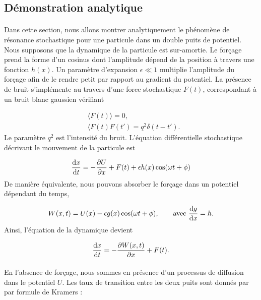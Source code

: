 \subsection{Démonstration analytique}

\paragraph{} Dans cette section, nous allons montrer analytiquement le phénomène de résonance stochastique pour une particule dans un double puits de potentiel. Nous supposons que la dynamique de la particule est sur-amortie. Le forçage prend la forme d'un cosinus %
dont l'amplitude dépend de la position à travers une fonction $h(x)$. Un paramètre d'expansion $\epsilon \ll 1$ multiplie l'amplitude du forçage afin de le rendre petit par rapport au gradient du potentiel. La présence de bruit s'implémente au travers d'une force stochastique $F(t)$, correspondant à un bruit blanc gaussien vérifiant

\begin{equation}\label{force_stochastique}
\begin{split}
	&\langle F(t) \rangle = 0, \\
	&\langle F(t)F(t') = q^2 \delta(t-t').
\end{split}
\end{equation}
Le paramètre $q^2$ est l'intensité du bruit. L'équation différentielle stochastique décrivant le mouvement de la particule est

\begin{equation}\label{SDE_particule}
	\dv{x}{t} = -\frac{\partial U}{\partial x} + F(t) + \epsilon h(x) \cos(\omega t + \phi)
\end{equation}
De manière équivalente, nous pouvons absorber le forçage dans un potentiel dépendant du temps,

\begin{equation}\label{potentiel_W}
	W(x,t) = U(x) - \epsilon g(x) \cos(\omega t + \phi), \qquad \text{avec } \dv{g}{x}=h.
\end{equation}
Ainsi, l'équation de la dynamique devient

\begin{equation}\label{SDE_potentiel_W}
	\dv{x}{t} = -\frac{\partial W(x,t)}{\partial x} + F(t).
\end{equation}

\paragraph{} En l'absence de forçage, nous sommes en présence d'un processus de diffusion dans le potentiel $U$. Les taux de transition entre les deux puits sont donnés par par formule de Kramers \cite{nicolis1982}:

